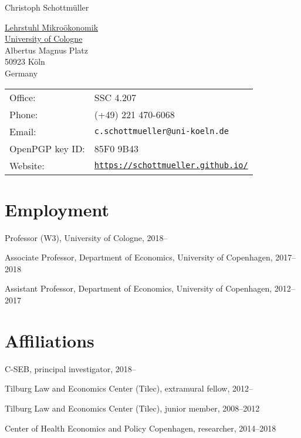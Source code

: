 \documentclass[a4paper]{article}
\def\name{Christoph Schottm\"uller}
\renewenvironment{itemize}{
  \begin{list}{}{
    \setlength{\leftmargin}{1.5em}
  }
}{
  \end{list}
}
\begin{document}
{\huge \name}


\vspace{0.25in}

\begin{minipage}{0.45\linewidth}
  \href{https://www.microtheory.uni-koeln.de/en/}{Lehrstuhl Mikro\"okonomik} \\
  \href{https://www.wiso.uni-koeln.de/en/en}{University of Cologne} \\
  Albertus Magnus Platz\\
  50923 K\"oln\\Germany
\end{minipage}
\hspace*{-.5cm} %
\begin{minipage}{0.45\linewidth}
  \begin{tabular}{ll} 
   Office: & SSC 4.207\\
    Phone: & (+49) 221 470-6068 \\
    Email: & {\tt{c.schottmueller@uni-koeln.de}}\\
    OpenPGP key ID: &  85F0 9B43\\
    Website: & \href{https://schottmueller.github.io/}{\tt https://schottmueller.github.io/}
  \end{tabular}
\end{minipage}


\section*{Employment}

\begin{itemize}
\item Professor (W3), University of Cologne, 2018--
  \item Associate Professor, Department of Economics, University of Copenhagen, 2017--2018
\item Assistant Professor, Department of Economics, University of Copenhagen, 2012--2017
\end{itemize}

\section*{Affiliations}
\begin{itemize}
\item C-SEB, principal investigator, 2018--
\item Tilburg Law and Economics Center (Tilec), extramural fellow, 2012--
\item Tilburg Law and Economics Center (Tilec), junior member, 2008--2012
\item Center of Health Economics and Policy Copenhagen, researcher, 2014--2018
\end{itemize}
\end{document}
